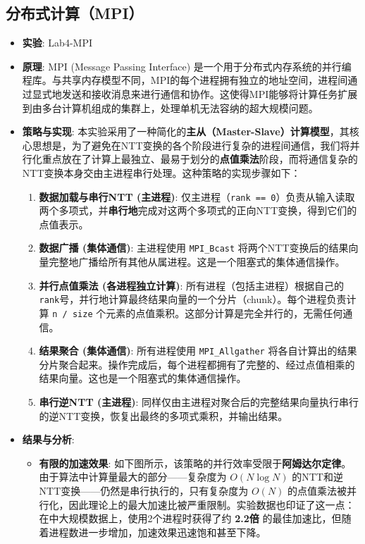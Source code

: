 \documentclass[a4paper]{article}
\begin{document}
\subsection{分布式计算（MPI）}
\begin{itemize}
    \item \textbf{实验}: Lab4-MPI
    \item \textbf{原理}: MPI (Message Passing Interface) 是一个用于分布式内存系统的并行编程库。与共享内存模型不同，MPI的每个进程拥有独立的地址空间，进程间通过显式地发送和接收消息来进行通信和协作。这使得MPI能够将计算任务扩展到由多台计算机组成的集群上，处理单机无法容纳的超大规模问题。
    \item \textbf{策略与实现}: 本实验采用了一种简化的\textbf{主从（Master-Slave）计算模型}，其核心思想是，为了避免在NTT变换的各个阶段进行复杂的进程间通信，我们将并行化重点放在了计算上最独立、最易于划分的\textbf{点值乘法}阶段，而将通信复杂的NTT变换本身交由主进程串行处理。这种策略的实现步骤如下：
    \begin{enumerate}
        \item \textbf{数据加载与串行NTT (主进程)}: 仅主进程（\texttt{rank == 0}）负责从输入读取两个多项式，并\textbf{串行地}完成对这两个多项式的正向NTT变换，得到它们的点值表示。
        \item \textbf{数据广播 (集体通信)}: 主进程使用 \texttt{MPI\_Bcast} 将两个NTT变换后的结果向量完整地广播给所有其他从属进程。这是一个阻塞式的集体通信操作。
        \item \textbf{并行点值乘法 (各进程独立计算)}: 所有进程（包括主进程）根据自己的\texttt{rank}号，并行地计算最终结果向量的一个分片（chunk）。每个进程负责计算 \texttt{n / size} 个元素的点值乘积。这部分计算是完全并行的，无需任何通信。
        \item \textbf{结果聚合 (集体通信)}: 所有进程使用 \texttt{MPI\_Allgather} 将各自计算出的结果分片聚合起来。操作完成后，每个进程都拥有了完整的、经过点值相乘的结果向量。这也是一个阻塞式的集体通信操作。
        \item \textbf{串行逆NTT (主进程)}: 同样仅由主进程对聚合后的完整结果向量执行串行的逆NTT变换，恢复出最终的多项式乘积，并输出结果。
    \end{enumerate}
    \item \textbf{结果与分析}:
    \begin{itemize}
        \item \textbf{有限的加速效果}: 如下图所示，该策略的并行效率受限于\textbf{阿姆达尔定律}。由于算法中计算量最大的部分——复杂度为 $O(N \log N)$ 的NTT和逆NTT变换——仍然是串行执行的，只有复杂度为 $O(N)$ 的点值乘法被并行化，因此理论上的最大加速比被严重限制。实验数据也印证了这一点：在中大规模数据上，使用2个进程时获得了约 \textbf{2.2倍} 的最佳加速比，但随着进程数进一步增加，加速效果迅速饱和甚至下降。

\end{itemize}
\end{itemize}
\end{document}
